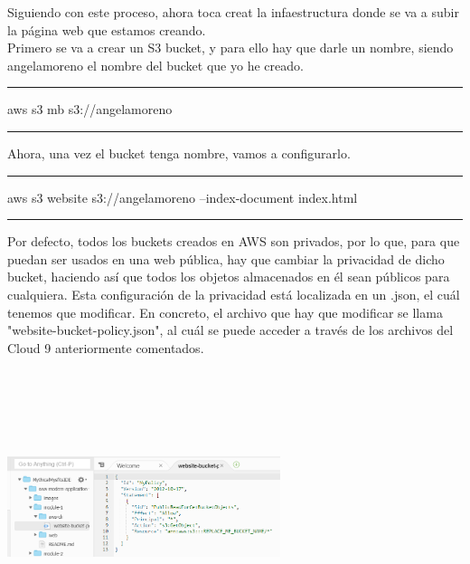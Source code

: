 \documentclass[english,runningheads,a4paper]{llncs}[2018/03/10]
\newenvironment{nscenter}
 {\parskip=0pt\par\nopagebreak\centering}
 {\par\noindent\ignorespacesafterend}
\begin{document}
Siguiendo con este proceso, ahora toca creat la infaestructura donde se va a 
subir la página web que estamos creando.\\
Primero se va a crear un S3 bucket, y para ello hay que darle un nombre, 
siendo angelamoreno el nombre del bucket que yo he creado.\\
\begin{nscenter}


\noindent\rule{10cm}{0.4pt}

aws s3 mb s3://angelamoreno

\noindent\rule{10cm}{0.4pt}
\end{nscenter}
\newline
Ahora, una vez el bucket tenga nombre, vamos a configurarlo.
\begin{nscenter}


\noindent\rule{10cm}{0.4pt}

aws s3 website s3://angelamoreno --index-document index.html

\noindent\rule{10cm}{0.4pt}
\end{nscenter}
Por defecto, todos los buckets creados en AWS son privados, por lo que, para 
que puedan ser usados en una web pública, hay que cambiar la privacidad de 
dicho bucket, haciendo así que todos los objetos almacenados en él sean 
públicos para cualquiera. Esta configuración de la privacidad está localizada 
en un .json, el cuál tenemos que modificar. En concreto, el archivo que hay 
que modificar se llama "website-bucket-policy.json", al cuál se puede acceder a
través de los archivos del Cloud 9 anteriormente comentados.
\newline
\begin{nscenter}
\includegraphics[width=8cm,height=8cm,keepaspectratio]{./Contenedores/AWS/24.png}
\end{nscenter}
\end{document}
